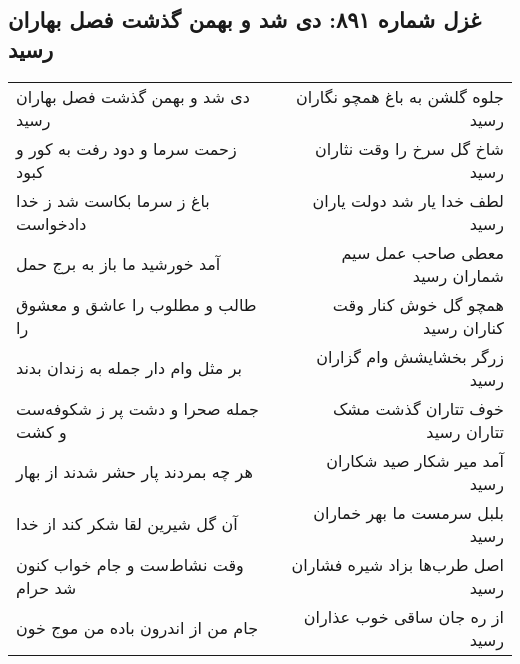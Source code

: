 \begin{center}
\section*{غزل شماره ۸۹۱: دی شد و بهمن گذشت فصل بهاران رسید}
\label{sec:0891}
\begin{longtable}{l p{0.5cm} r}
دی شد و بهمن گذشت فصل بهاران رسید
&&
جلوه گلشن به باغ همچو نگاران رسید
\\
زحمت سرما و دود رفت به کور و کبود
&&
شاخ گل سرخ را وقت نثاران رسید
\\
باغ ز سرما بکاست شد ز خدا دادخواست
&&
لطف خدا یار شد دولت یاران رسید
\\
آمد خورشید ما باز به برج حمل
&&
معطی صاحب عمل سیم شماران رسید
\\
طالب و مطلوب را عاشق و معشوق را
&&
همچو گل خوش کنار وقت کناران رسید
\\
بر مثل وام دار جمله به زندان بدند
&&
زرگر بخشایشش وام گزاران رسید
\\
جمله صحرا و دشت پر ز شکوفه‌ست و کشت
&&
خوف تتاران گذشت مشک تتاران رسید
\\
هر چه بمردند پار حشر شدند از بهار
&&
آمد میر شکار صید شکاران رسید
\\
آن گل شیرین لقا شکر کند از خدا
&&
بلبل سرمست ما بهر خماران رسید
\\
وقت نشاط‌ست و جام خواب کنون شد حرام
&&
اصل طرب‌ها بزاد شیره فشاران رسید
\\
جام من از اندرون باده من موج خون
&&
از ره جان ساقی خوب عذاران رسید
\\
\end{longtable}
\end{center}
